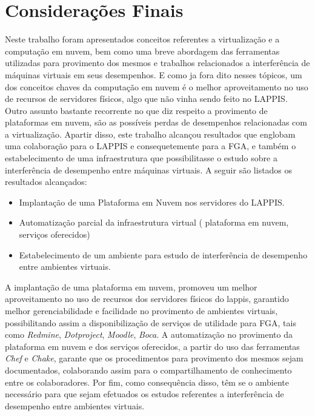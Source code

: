 \chapter{Considerações Finais}
\label{cap:consideracoes_finais}


Neste trabalho foram apresentados conceitos referentes a virtualização e a computação em nuvem, bem como uma breve abordagem das ferramentas utilizadas para provimento dos mesmos e trabalhos relacionados a interferência de máquinas virtuais em seus desempenhos. E como ja fora dito nesses tópicos, um dos conceitos chaves da computação em nuvem é o melhor aproveitamento no uso de recursos de servidores físicos, algo que não vinha sendo feito no LAPPIS. Outro assunto bastante recorrente no que diz respeito a provimento de plataformas em nuvem, são as possíveis perdas de desempenhos relacionadas com a virtualização. Apartir disso, este trabalho alcançou resultados que englobam uma colaboração para o LAPPIS e consequetemente para a FGA, e também o estabelecimento de uma infraestrutura que possibilitasse o estudo sobre a interferência de desempenho entre máquinas virtuais. A seguir são listados os resultados alcançados:  

\begin{itemize}
  \item Implantação de uma Plataforma em Nuvem nos servidores do LAPPIS.
  \item Automatização parcial da infraestrutura virtual ( plataforma em nuvem, serviços oferecidos)
  \item Estabelecimento de um ambiente para estudo de interferência de desempenho entre ambientes virtuais.
\end{itemize}

A implantação de uma plataforma em nuvem, promoveu um melhor aproveitamento no uso de recursos dos servidores físicos do lappis, garantido melhor gerenciabilidade e facilidade no provimento de ambientes virtuais, possibilitando assim a disponibilização de serviços de utilidade para FGA, tais como \textit{Redmine}, \textit{Dotproject}, \textit{Moodle}, \textit{Boca}. A automatização no provimento da plataforma em nuvem e dos serviços oferecidos, a partir do uso das ferramentas \textit{Chef} e \textit{Chake}, garante que os procedimentos para provimento dos mesmos sejam documentados, colaborando assim para o compartilhamento de conhecimento entre os colaboradores. Por fim, como consequência disso, têm se o ambiente necessário para que sejam efetuados os estudos referentes a interferência de desempenho entre ambientes virtuais.

